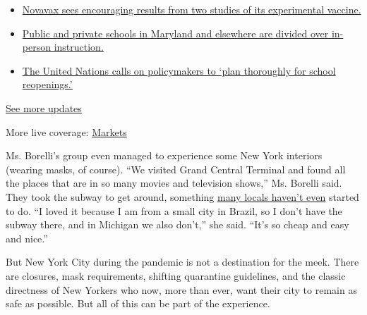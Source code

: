\begin{itemize}
\tightlist
\item
  \href{https://www.nytimes3xbfgragh.onion/2020/08/04/world/coronavirus-cases.html?action=click\&pgtype=Article\&state=default\&region=MAIN_CONTENT_1\&context=storylines_live_updates\#link-1228a480}{Novavax
  sees encouraging results from two studies of its experimental
  vaccine.}
\item
  \href{https://www.nytimes3xbfgragh.onion/2020/08/04/world/coronavirus-cases.html?action=click\&pgtype=Article\&state=default\&region=MAIN_CONTENT_1\&context=storylines_live_updates\#link-4825b93}{Public
  and private schools in Maryland and elsewhere are divided over
  in-person instruction.}
\item
  \href{https://www.nytimes3xbfgragh.onion/2020/08/04/world/coronavirus-cases.html?action=click\&pgtype=Article\&state=default\&region=MAIN_CONTENT_1\&context=storylines_live_updates\#link-50f7386d}{The
  United Nations calls on policymakers to `plan thoroughly for school
  reopenings.'}
\end{itemize}

\href{https://www.nytimes3xbfgragh.onion/2020/08/04/world/coronavirus-cases.html?action=click\&pgtype=Article\&state=default\&region=MAIN_CONTENT_1\&context=storylines_live_updates}{See
more updates}

More live coverage:
\href{https://www.nytimes3xbfgragh.onion/live/2020/08/04/business/stock-market-today-coronavirus?action=click\&pgtype=Article\&state=default\&region=MAIN_CONTENT_1\&context=storylines_live_updates}{Markets}

Ms. Borelli's group even managed to experience some New York interiors
(wearing masks, of course). ``We visited Grand Central Terminal and
found all the places that are in so many movies and television shows,''
Ms. Borelli said. They took the subway to get around, something
\href{https://www.nytimes3xbfgragh.onion/2020/07/17/nyregion/coronavirus-subways-spread-nyc.html}{many
locals haven't even} started to do. ``I loved it because I am from a
small city in Brazil, so I don't have the subway there, and in Michigan
we also don't,'' she said. ``It's so cheap and easy and nice.''

But New York City during the pandemic is not a destination for the meek.
There are closures, mask requirements, shifting quarantine guidelines,
and the classic directness of New Yorkers who now, more than ever, want
their city to remain as safe as possible. But all of this can be part of
the experience.


